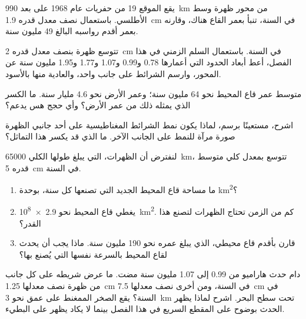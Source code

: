 \begin{exercise}[$\star\star$]\label{exo:g11:drift-to-spreading:8}
يقع الموقع 19 من حفريات عام 1968 على بعد \qty{990}{km} من محور
ظهرة وسط الأطلسي. باستعمال نصف معدل قدره \qty{1.9}{cm} في السنة، تنبأ
بعمر القاع هناك، وقارنه بعمر أقدم رواسبه البالغ \num{49}
مليون سنة.
\end{exercise}

\begin{exercise}[$\star\star$]\label{exo:g11:drift-to-spreading:9}
تتوسع ظهرة بنصف معدل قدره \qty{2}{cm} في السنة. باستعمال السلم الزمني في
هذا الفصل، أعط أبعاد الحدود التي أعمارها 0.78 و0.99 و1.07 و1.77 و1.95
مليون سنة عن المحور، وارسم الشرائط على جانب واحد،
والعادية منها بالأسود.
\end{exercise}

\begin{exercise}[$\star\star$]\label{exo:g11:drift-to-spreading:10}
متوسط عمر قاع المحيط نحو \num{64} مليون سنة؛ وعمر الأرض
نحو \num{4.6} مليار سنة. ما الكسر الذي يمثله ذلك من عمر الأرض؟
وأي حجج هس يدعم؟
\end{exercise}

\begin{exercise}[$\star\star$]\label{exo:g11:drift-to-spreading:11}
اشرح، مستعينًا برسم، لماذا يكون نمط الشرائط المغناطيسية على أحد جانبي
الظهرة صورة مرآة للنمط على الجانب الآخر. ما الذي قد يكسر
هذا التماثل؟
\end{exercise}

\begin{exercise}[$\star\star\star$]\label{exo:g11:drift-to-spreading:12}
لنفترض أن الظهرات، التي يبلغ طولها الكلي \qty{65000}{km}، تتوسع بمعدل كلي متوسط
قدره \qty{5}{cm} في السنة.
\begin{enumerate}
  \item ما مساحة قاع المحيط الجديد التي تصنعها كل سنة، بوحدة \unit{km^2}؟
  \item يغطي قاع المحيط نحو \qty{2.9e8}{km^2}. كم من الزمن تحتاج
        الظهرات لتصنع هذا القدر؟
  \item قارن بأقدم قاع محيطي، الذي يبلغ عمره نحو \num{190} مليون سنة.
        ماذا يجب أن يحدث لقاع المحيط بالسرعة نفسها التي يُصنع بها؟
\end{enumerate}
\end{exercise}

\begin{exercise}[$\star\star\star$]\label{exo:g11:drift-to-spreading:13}
دام حدث هاراميو من \num{0.99} إلى \num{1.07} مليون سنة مضت.
ما عرض شريطه على كل جانب من ظهرة نصف معدلها
\qty{1.25}{cm} في السنة، ومن أخرى نصف معدلها \qty{7.5}{cm} في السنة؟ يقع الصخر
الممغنط على عمق نحو \qty{3}{km} تحت سطح البحر. اشرح لماذا يظهر الحدث
بوضوح على المقطع السريع في هذا الفصل بينما لا يكاد يظهر على البطيء.
\end{exercise}

